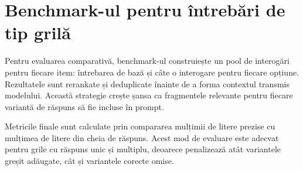 \documentclass[12pt, a4paper, oneside, romanian]{teza-upb}
\begin{document}
\label{anexa:evaluator-retry}


\section{Benchmark-ul pentru întrebări de tip grilă}

Pentru evaluarea comparativă, benchmark-ul construiește un pool de interogări pentru fiecare item: întrebarea de bază și câte o interogare pentru fiecare opțiune. Rezultatele sunt rerankate și deduplicate înainte de a forma contextul transmis modelului. Această strategie crește șansa ca fragmentele relevante pentru fiecare variantă de răspuns să fie incluse în prompt.

\label{anexa:benchmark-reranking}


Metricile finale sunt calculate prin compararea mulțimii de litere prezise cu mulțimea de litere din cheia de răspuns. Acest mod de evaluare este adecvat pentru grile cu răspuns unic și multiplu, deoarece penalizează atât variantele greșit adăugate, cât și variantele corecte omise.

\label{anexa:benchmark-metrics}

\end{document}

